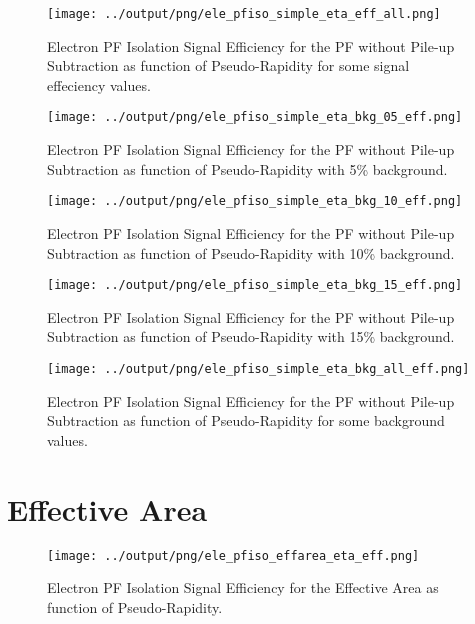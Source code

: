\documentclass[11pt]{book}
\begin{document}
\begin{figure}[htb]
\centering
\texttt{[image: ../output/png/ele\_pfiso\_simple\_eta\_eff\_all.png]}
\caption{Electron PF Isolation Signal Efficiency for the PF without Pile-up Subtraction as function of Pseudo-Rapidity for some signal effeciency values.}
\label{fig:ele_pfiso_eta_eff_simple_eff_all}
\end{figure}

\begin{figure}[htb]
\centering
\texttt{[image: ../output/png/ele\_pfiso\_simple\_eta\_bkg\_05\_eff.png]}
\caption{Electron PF Isolation Signal Efficiency for the PF without Pile-up Subtraction as function of Pseudo-Rapidity with 5\% background.}
\label{fig:ele_pfiso_eta_bkg_simple_bkg_05_eff}
\end{figure}

\begin{figure}[htb]
\centering
\texttt{[image: ../output/png/ele\_pfiso\_simple\_eta\_bkg\_10\_eff.png]}
\caption{Electron PF Isolation Signal Efficiency for the PF without Pile-up Subtraction as function of Pseudo-Rapidity with 10\% background.}
\label{fig:ele_pfiso_eta_bkg_simple_bkg_10_eff}
\end{figure}

\begin{figure}[htb]
\centering
\texttt{[image: ../output/png/ele\_pfiso\_simple\_eta\_bkg\_15\_eff.png]}
\caption{Electron PF Isolation Signal Efficiency for the PF without Pile-up Subtraction as function of Pseudo-Rapidity with 15\% background.}
\label{fig:ele_pfiso_eta_bkg_simple_bkg_15_eff}
\end{figure}

\begin{figure}[htb]
\centering
\texttt{[image: ../output/png/ele\_pfiso\_simple\_eta\_bkg\_all\_eff.png]}
\caption{Electron PF Isolation Signal Efficiency for the PF without Pile-up Subtraction as function of Pseudo-Rapidity for some background values.}
\label{fig:ele_pfiso_eta_bkg_simple_bkg_all_eff}
\end{figure}
\clearpage

\section{Effective Area}
\begin{figure}[htb]
\centering
\texttt{[image: ../output/png/ele\_pfiso\_effarea\_eta\_eff.png]}
\caption{Electron PF Isolation Signal Efficiency for the Effective Area as function of Pseudo-Rapidity.}
\label{fig:ele_pfiso_eta_eff_effarea}
\end{figure}
\end{document}
